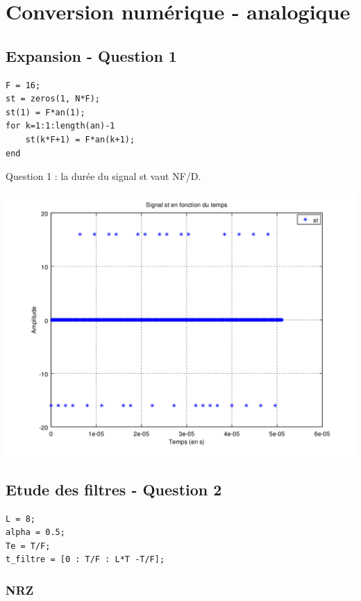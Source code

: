 \documentclass{acm_proc_article-sp}
\begin{document}
\section{Conversion numérique - analogique}
\subsection{Expansion - Question 1}

\begin{lstlisting}
F = 16;
st = zeros(1, N*F);
st(1) = F*an(1);
for k=1:1:length(an)-1
    st(k*F+1) = F*an(k+1);
end
\end{lstlisting}

Question 1 : la durée du signal st vaut NF/D.

\begin{center}
\includegraphics[scale=0.45]{st_3.png}
\end{center}

\subsection{Etude des filtres - Question 2}

\begin{lstlisting}
L = 8;
alpha = 0.5;
Te = T/F;
t_filtre = [0 : T/F : L*T -T/F];
\end{lstlisting}

\subsubsection{NRZ}
\end{document}
